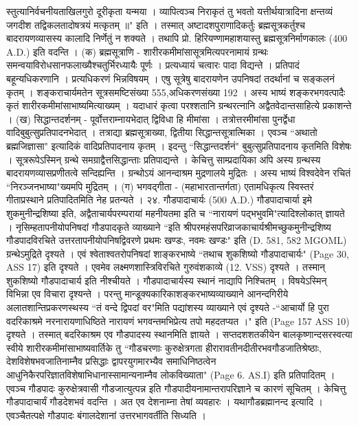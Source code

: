 स्तुत्यानिर्वचनीयताखिलगुरो दूरीकृता यन्मया ।
व्यापित्वञ्च निराकृतं तु भवतो यत्तीर्थयात्रादिना
क्षन्तव्यं जगदीश तद्विकलतादोषत्रयं मत्कृतम् ॥" इति ।
तस्मात् अष्टादशपुराणादिकर्तुः ब्रह्मसूत्रकर्तुश्च बादरायणव्यासस्य कालादि निर्णेतुं न शक्यते । तथापि प्रो. हिरियण्णामहाशयास्तु ब्रह्मसूत्रनिर्माणकालः (400 A.D.) इति वदन्ति ।
(क) ब्रह्मसूत्राणि - शारीरकमीमांसासूत्रमित्यपरनामायं ग्रन्थः समन्वयाविरोधसानफलाख्यैश्चतुर्भिरध्यायैः पूर्णः । प्रत्यध्यायं चत्वारः पादा विद्यन्ते । प्रतिपादं बहून्यधिकरणानि । प्रत्यधिकरणं भिन्नविषयम् । एषु सूत्रेषु बादरायणेन उपनिषदां तदर्थानां च सङ्कलनं कृतम् । शङ्कराचार्यमतेन सूत्रसमष्टिसंख्या 555,अधिकरणसंख्या 192 । अस्य भाष्यं शङ्करभगवत्पादैः कृतं शारीरकमीमांसाभाष्यमित्याख्यम् । यदाधारं कृत्वा परश्शतानि ग्रन्थरत्नानि अद्वैतवेदान्तसाहित्ये प्रकाशन्ते ।
(ख) सिद्धान्तदर्शनम् - पूर्वोत्तराम्नायभेदात् द्विविधा हि मीमांसा । तत्रोत्तरमीमांसा पुनर्द्वेधा वादिबुबुत्सुप्रतिपादनभेदात् । तत्राद्या ब्रह्मसूत्राख्या, द्वितीया सिद्धान्तसूत्रात्मिका । एवञ्च ``अथातो ब्रह्मजिज्ञासा" इत्यादिकं वादिप्रतिपादनाय कृतम् । इदन्तु ``सिद्धान्तदर्शनं" बुबुत्सुप्रतिपादनाय कृतमिति विशेषः । सूत्ररूपेऽस्मिन् ग्रन्थे समग्राद्वैत्तसिद्धान्ताः प्रतिपाद्यन्ते । केचित्तु साम्प्रदायिका अपि अस्य ग्रन्थस्य बादरायणव्यासप्रणीतत्वे सन्दिह्यन्ति । ग्रन्थोऽयं आनन्दाश्रम मुद्रणालये मुद्रितः । अस्य भाष्यं विश्वदेवेन रचितं ``निरञ्जनभाष्या"ख्यमपि मुद्रितम् ।
(ग) भगवद्गीता - (महाभारतान्तर्गता) एतामधिकृत्य स्विस्तरं गीताप्रस्थाने प्रतिपादितमिति नेह प्रतन्यते ।
२४. गौडपादाचार्यः (500 A.D.)
गौडपादाचार्या इमे शुकमुनीन्द्रशिष्या इति, अद्वैताचार्यपरम्परायां महनीयतमा इति च ``नारायणं पद्भभुवमि"त्यादिश्लोकात् ज्ञायते । नृसिम्हतापनीयोपनिषदां गौडपादकृते व्याख्याने ``इति श्रीपरमहंसपरिव्राजकाचार्यश्रीमच्छुकमुनीन्द्रशिष्य गौडपादविरचिते उत्तरतापनीयोपनिषद्विवरणे प्रथमः खण्डः, नवमः खण्डः" इति (D. 581, 582 MGOML) ग्रन्थेऽमुद्रिते दृश्यते । एवं श्वेताश्वतरोपनिषदां शाङ्करभाष्ये ``तथाच शुकशिष्यो गौडपादाचार्यः" (Page 30, ASS 17) इति दृश्यते । एवमेव लक्ष्मणशास्त्रिविरचिते गुरुवंशकाव्ये (12. VSS) दृश्यते । तस्मान् शुकशिष्यो गौडपादाचार्य इति नीश्चीयते ।
गौडपादाचार्यस्य स्थानं नाद्यापि निश्चितम् । विषयेऽस्मिन् विभिन्ना एव विचारा दृश्यन्ते । परन्तु मान्डूक्यकारिकाशङ्करभाष्यव्याख्याने आनन्दगिरीये अलातशान्तिप्रकरणस्थस्य ``तं वन्दे द्विपदां वर"मिति पद्यांशस्य व्याख्याने एवं दृश्यते -``आचार्यो हि पुरा वदरिकाश्रमे नरनारायणाधिष्ठिते नारायणं भगवन्तमभिप्रेत्य तपो महदतप्यत ।" इति (Page 157 ASS 10) दृश्यते । तस्मात् बदरिकाश्रम एव गौडपादस्य स्थानमिति ज्ञायते । सप्तदशशतकीयेन बालकृष्णान्दसरस्वत्या स्वीये शारीरकमीमांसाभाष्यवार्तिके तु ``गौडचरणाः कुरुक्षेत्रगता हीरारावतीनदीतीरभवगौडजातिश्रेष्ठाः, देशविशेषभवजातिनाम्नैव प्रसिद्धाः द्वापरयुगमारभ्यैव समाधिनिष्ठत्वेन आधुनिकैरपरिज्ञातविशेषाभिधानास्सामान्यनाम्नैव लोकविख्याता" (Page 6. AS.I) इति प्रतिपादितम् । एवञ्च गौडपादः कुरुक्षेत्रवासी गौडजात्युत्पन्न इति गौडपादीयनामान्तरापरिज्ञाने च कारणं सूचितम् । केचित्तु गौडपादाचार्यं गौडदेशभवं वदन्ति । अत एव देशनाम्ना तेषां व्यवहारः । यथागौडब्रह्मानन्द इत्यादि । एवञ्चैतत्पक्षे गौडपादः बंगालदेशानां उत्तरभागवर्तीति सिध्यति ।
